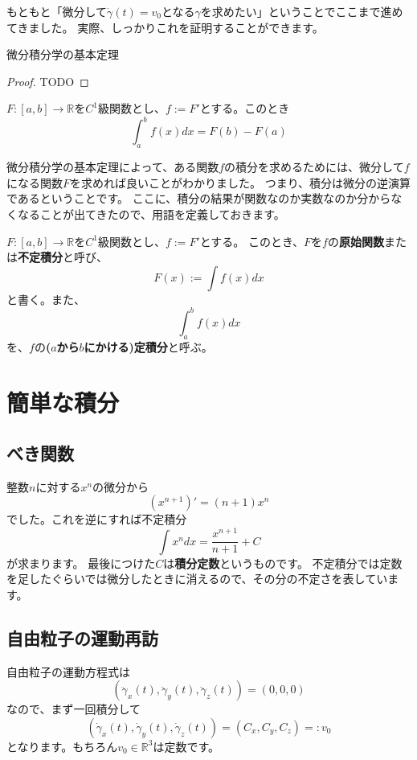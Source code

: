 もともと「微分して$\dot\gamma(t)=v_0$となる$\gamma$を求めたい」ということでここまで進めてきました。
実際、しっかりこれを証明することができます。
\begin{theorem}
  微分積分学の基本定理
\end{theorem}
\begin{proof}
  TODO
\end{proof}
\begin{corollary}
  $F:[a,b]\to\mathbb{R}$を$C^1$級関数とし、$f:=F'$とする。このとき
  \[
    \int_a^b f(x)dx=F(b)-F(a)
  \]
\end{corollary}

微分積分学の基本定理によって、ある関数$f$の積分を求めるためには、微分して$f$になる関数$F$を求めれば良いことがわかりました。
つまり、積分は微分の逆演算であるということです。
ここに、積分の結果が関数なのか実数なのか分からなくなることが出てきたので、用語を定義しておきます。
\begin{definition}
  $F:[a,b]\to\mathbb{R}$を$C^1$級関数とし、$f:=F'$とする。
  このとき、$F$を$f$の\textbf{原始関数}または\textbf{不定積分}と呼び、
  \[
    F(x):=\int f(x)dx
  \]
  と書く。また、
  \[
    \int_a^b f(x)dx
  \]
  を、$f$の\textbf{($a$から$b$にかける)定積分}と呼ぶ。
\end{definition}



\section{簡単な積分}

\subsection{べき関数}

整数$n$に対する$x^n$の微分から
\[
  (x^{n+1})'=(n+1)x^n
\]
でした。これを逆にすれば不定積分
\[
  \int x^n dx=\frac{x^{n+1}}{n+1}+C
\]
が求まります。
最後につけた$C$は\textbf{積分定数}というものです。
不定積分では定数を足したぐらいでは微分したときに消えるので、その分の不定さを表しています。

\subsection{自由粒子の運動再訪}

自由粒子の運動方程式は
\[
  (\ddot\gamma_x(t),\ddot\gamma_y(t),\ddot\gamma_z(t))=(0,0,0)
\]
なので、まず一回積分して
\[
  (\dot\gamma_x(t),\dot\gamma_y(t),\dot\gamma_z(t))=(C_x,C_y,C_z)=:v_0
\]
となります。もちろん$v_0\in\mathbb{R}^3$は定数です。

